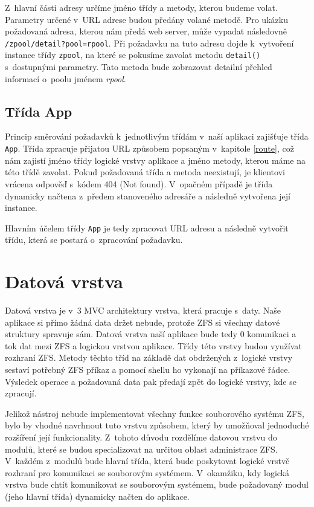 Z~hlavní části adresy určíme jméno třídy a metody, kterou budeme volat. Parametry určené v~URL adrese budou předány volané metodě. Pro ukázku požadovaná adresa, kterou nám předá web server, může vypadat následovně \verb|/zpool/detail?pool=rpool|.
Při požadavku na tuto adresu dojde k~vytvoření instance třídy \verb|zpool|, na které se pokusíme zavolat metodu \verb|detail()| s~dostupnými parametry. Tato metoda bude zobrazovat detailní přehled informací o~poolu jménem \emph{rpool}.
    \subsection{Třída App}
    Princip směrování požadavků k~jednotlivým třídám v~naší aplikaci zajišťuje třída \verb|App|. Třída zpracuje přijatou URL způsobem popsaným v~kapitole \ref{route}, což nám zajistí jméno třídy logické vrstvy aplikace a jméno metody, kterou máme na této třídě zavolat. Pokud požadovaná třída a metoda neexistují, je klientovi vrácena odpověď s~kódem 404 (Not found). V~opačném případě je třída dynamicky načtena z~předem stanoveného adresáře a následně vytvořena její instance.

    Hlavním účelem třídy \verb|App| je tedy zpracovat URL adresu a následně vytvořit třídu, která se postará o~zpracování požadavku.

\section{Datová vrstva}
Datová vrstva je v~3 MVC architektury vrstva, která pracuje s~daty. Naše aplikace si přímo žádná data držet nebude, protože ZFS si všechny datové struktury spravuje sám. Datová vrstva naší aplikace bude tedy 0 komunikaci a tok dat mezi ZFS a logickou vrstvou aplikace. Třídy této vrstvy budou využívat rozhraní ZFS. Metody těchto tříd na základě dat obdržených z~logické vrstvy sestaví potřebný ZFS příkaz a pomocí shellu ho vykonají na příkazové řádce. Výsledek operace a požadovaná data pak předají zpět do logické vrstvy, kde se zpracují.

Jelikož nástroj nebude implementovat všechny funkce souborového systému ZFS, bylo by vhodné navrhnout tuto vrstvu způsobem, který by umožňoval jednoduché rozšíření její funkcionality.
Z~tohoto důvodu rozdělíme datovou vrstvu do modulů, které se budou specializovat na určitou oblast administrace ZFS. V~každém z~modulů bude hlavní třída, která bude poskytovat logické vrstvě rozhraní pro komunikaci se souborovým systémem. V~okamžiku, kdy logická vrstva bude chtít komunikovat se souborovým systémem, bude požadovaný modul (jeho hlavní třída) dynamicky načten do aplikace.
